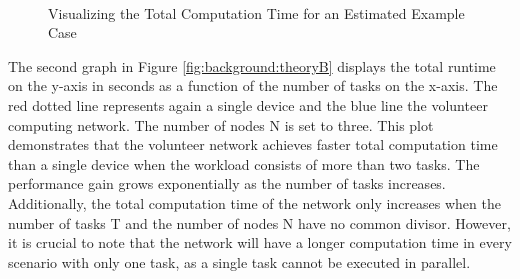 \begin{figure}[bth]
  \myfloatalign
   \\
   \caption{Visualizing the Total Computation Time for an Estimated Example Case}
   \label{fig:background:theoryplot}
\end{figure}
The second graph in Figure \ref{fig:background:theoryB} displays the total runtime on the y-axis in seconds as a function of the number of tasks on the x-axis. The red dotted line represents again a single device and the blue line the volunteer computing network. The number of nodes N is set to three. This plot demonstrates that the volunteer network achieves faster total computation time than a single device when the workload consists of more than two tasks. The performance gain grows exponentially as the number of tasks increases. Additionally, the total computation time of the network only increases when the number of tasks T and the number of nodes N have no common divisor. However, it is crucial to note that the network will have a longer computation time in every scenario with only one task, as a single task cannot be executed in parallel.

